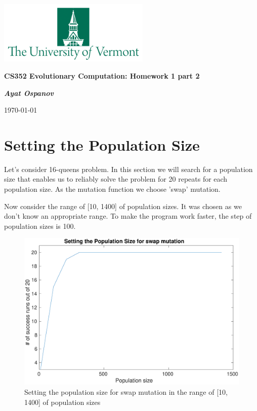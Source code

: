\documentclass[12pt, a4paper]{article}
\begin{document}
    \begin{center}
        \includegraphics[height=3cm]{UVM}

        {\large\textbf{
            CS352 Evolutionary Computation: Homework 1 part 2
        }}

        \vspace{0.3cm}

        \textit{\textbf{Ayat Ospanov}}

        \today
    \end{center}

    \tableofcontents
    \section{Setting the Population Size}\label{sec:pop_setup}
        Let's consider 16-queens problem. In this section we will search for
        a population size that enables us to reliably solve the problem for
        20 repeats for each population size. As the mutation function we
        choose 'swap' mutation.

        Now consider the range of [10, 1400] of population sizes. It was
        chosen as we don't know an appropriate range. To make the program work
        faster, the step of population sizes is 100.

        \begin{figure}[H]
            \centering
            \includegraphics[width=\linewidth]{pop_selection_big.eps}
            \caption{Setting the population size for swap mutation in the range
                of [10, 1400] of population sizes}
            \label{fig:pop_sel_big}
        \end{figure}
\end{document}

